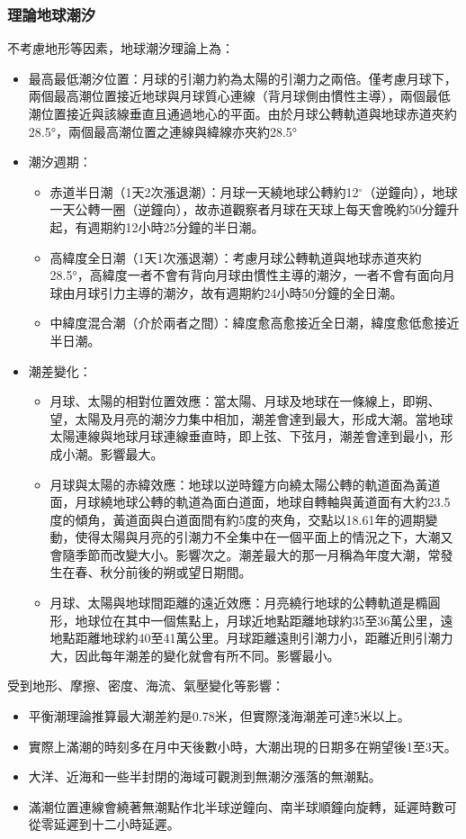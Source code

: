 \documentclass[a4paper,12pt]{report}
\begin{document}
\subsubsection{理論地球潮汐}
不考慮地形等因素，地球潮汐理論上為：
\begin{itemize}
\item 最高最低潮汐位置：月球的引潮力約為太陽的引潮力之兩倍。僅考慮月球下，兩個最高潮位置接近地球與月球質心連線（背月球側由慣性主導），兩個最低潮位置接近與該線垂直且通過地心的平面。由於月球公轉軌道與地球赤道夾約28.5°，兩個最高潮位置之連線與緯線亦夾約28.5°
\item 潮汐週期：
\begin{itemize}
\item 赤道半日潮（1天2次漲退潮）：月球一天繞地球公轉約12$^\circ$（逆鐘向），地球一天公轉一圈（逆鐘向），故赤道觀察者月球在天球上每天會晚約50分鐘升起，有週期約12小時25分鐘的半日潮。
\item 高緯度全日潮（1天1次漲退潮）：考慮月球公轉軌道與地球赤道夾約28.5°，高緯度一者不會有背向月球由慣性主導的潮汐，一者不會有面向月球由月球引力主導的潮汐，故有週期約24小時50分鐘的全日潮。
\item 中緯度混合潮（介於兩者之間）：緯度愈高愈接近全日潮，緯度愈低愈接近半日潮。
\end{itemize}
\item 潮差變化：
\begin{itemize}
\item 月球、太陽的相對位置效應：當太陽、月球及地球在一條線上，即朔、望，太陽及月亮的潮汐力集中相加，潮差會達到最大，形成大潮。當地球太陽連線與地球月球連線垂直時，即上弦、下弦月，潮差會達到最小，形成小潮。影響最大。
\item 月球與太陽的赤緯效應：地球以逆時鐘方向繞太陽公轉的軌道面為黃道面，月球繞地球公轉的軌道為面白道面，地球自轉軸與黃道面有大約23.5度的傾角，黃道面與白道面間有約5度的夾角，交點以18.61年的週期變動，使得太陽與月亮的引潮力不全集中在一個平面上的情況之下，大潮又會隨季節而改變大小。影響次之。潮差最大的那一月稱為年度大潮，常發生在春、秋分前後的朔或望日期間。
\item 月球、太陽與地球間距離的遠近效應：月亮繞行地球的公轉軌道是橢圓形，地球位在其中一個焦點上，月球近地點距離地球約35至36萬公里，遠地點距離地球約40至41萬公里。月球距離遠則引潮力小，距離近則引潮力大，因此每年潮差的變化就會有所不同。影響最小。
\end{itemize}
\end{itemize}
受到地形、摩擦、密度、海流、氣壓變化等影響：
\begin{itemize}
\item 平衡潮理論推算最大潮差約是0.78米，但實際淺海潮差可達5米以上。
\item 實際上滿潮的時刻多在月中天後數小時，大潮出現的日期多在朔望後1至3天。
\item 大洋、近海和一些半封閉的海域可觀測到無潮汐漲落的無潮點。
\item 滿潮位置連線會繞著無潮點作北半球逆鐘向、南半球順鐘向旋轉，延遲時數可從零延遲到十二小時延遲。
\end{itemize}
\end{document}
